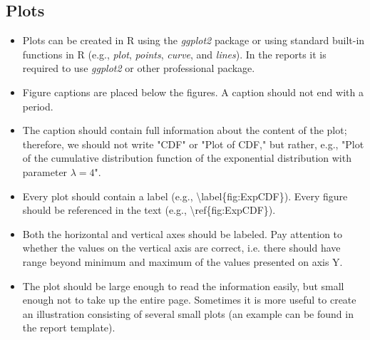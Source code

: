\documentclass[12pt, a4paper]{article}\usepackage[]{graphicx}\usepackage[]{xcolor}
\begin{document}
\subsection{Plots}
\begin{itemize}
\item 
Plots can be created in R using the \textit{ggplot2} package or using standard built-in functions in R (e.g., \textit{plot}, \textit{points}, \textit{curve}, and \textit{lines}). In the reports it is required to use \textit{ggplot2} or other professional package.
\item 
Figure captions are placed below the figures. A caption should not end with a period.
\item 
The caption should contain full information about the content of the plot; therefore, we should not write "CDF" or "Plot of CDF," but rather, e.g., "Plot of the cumulative distribution function of the exponential distribution with parameter $\lambda=4$". 
\item 
Every plot should contain a label (e.g., \textbackslash label\{fig:ExpCDF\}). Every figure should be referenced in the text (e.g., \textbackslash ref\{fig:ExpCDF\}). 
\item Both the horizontal and vertical axes should be labeled. Pay attention to whether the values on the vertical axis are correct, i.e. there should have range beyond minimum and maximum of the values presented on axis Y.
\item The plot should be large enough to read the information easily, but small enough not to take up the entire page. Sometimes it is more useful to create an illustration consisting of several small plots (an example can be found in the report template).
\end{itemize}
\end{document}
